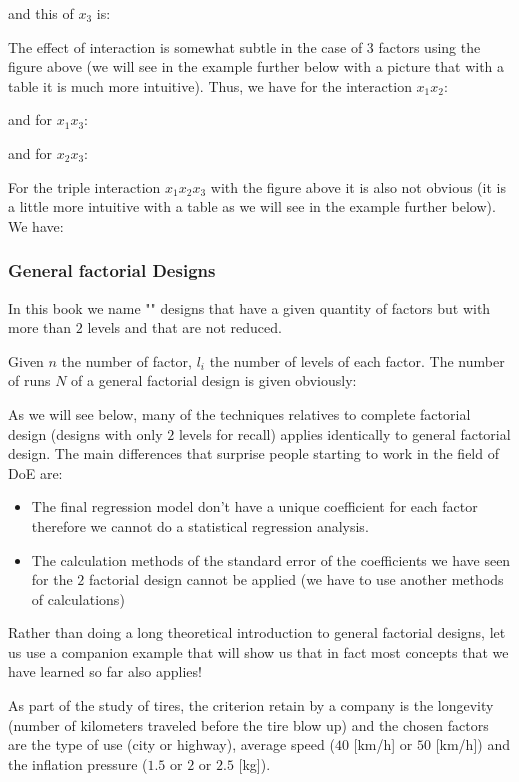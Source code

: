 	and this of $x_3$ is:
	
	The effect of interaction is somewhat subtle in the case of $3$ factors using the figure above (we will see in the example further below with a picture that with a table it is much more intuitive). Thus, we have for the interaction $x_1x_2$:
	
	and for $x_1x_3$:
	
	and for $x_2x_3$:
	
	
	For the triple interaction $x_1x_2x_3$ with the figure above it is also not obvious (it is a little more intuitive with a table as we will see in the example further below). We have:
	
	
	\pagebreak
	\subsubsection{General factorial Designs}
	In this book we name "" designs that have a given quantity of factors but with more than $2$ levels and that are not reduced. 
	
	Given $n$ the number of factor, $l_i$ the number of levels of each factor. The number of runs $N$ of a general factorial design is given obviously:
	
	As we will see below, many of the techniques relatives to complete factorial design (designs with only $2$ levels for recall) applies identically to general factorial design. The main differences that surprise people starting to work in the field of DoE are:
	\begin{itemize}
		\item The final regression model don't have a unique coefficient for each factor therefore we cannot do a statistical regression analysis.
		
		\item The calculation methods of the standard error of the coefficients we have seen for the $2$ factorial design cannot be applied (we have to use another methods of calculations)
	\end{itemize}

	Rather than doing a long theoretical introduction to general factorial designs, let us use a companion example that will show us that in fact most concepts that we have learned so far also applies!
	
	As part of the study of tires, the criterion retain by a company is the longevity (number of kilometers traveled before the tire blow up) and the chosen factors are the type of use (city or highway), average speed ($40$ [km/h] or $50$ [km/h]) and the inflation pressure ($1.5$ or $2$ or $2.5$ [kg]).\\
	
